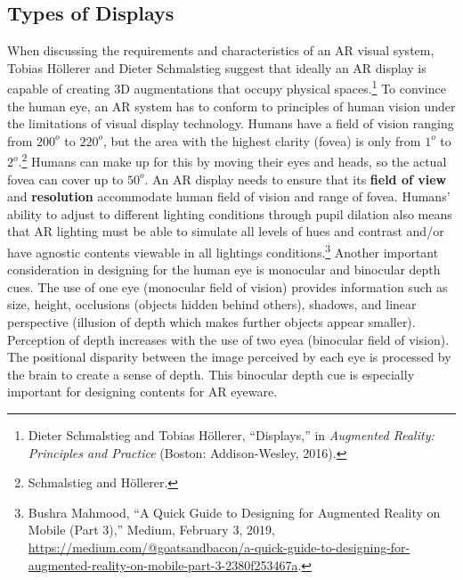 \subsection{Types of Displays}
When discussing the requirements and characteristics of an AR visual system, Tobias Höllerer and Dieter Schmalstieg suggest that ideally an AR display is capable of creating 3D augmentations that occupy physical spaces.\footnote{Dieter Schmalstieg and Tobias Höllerer, “Displays,” in \textit{Augmented Reality: Principles and Practice} (Boston: Addison-Wesley, 2016).} To convince the human eye, an AR system has to conform to principles of human vision under the limitations of visual display technology. Humans have a field of vision ranging from $200^o$ to $220^o$, but the area with the highest clarity (fovea) is only from $1^o$ to $2^o$.\footnote{Schmalstieg and Höllerer.} Humans can make up for this by moving their eyes and heads, so the actual fovea can cover up to $50^o$. An AR display needs to ensure that its \textbf{field of view} and \textbf{resolution} accommodate human field of vision and range of fovea. Humans' ability to adjust to different lighting conditions through pupil dilation also means that AR lighting must be able to simulate all levels of hues and contrast and/or have agnostic contents viewable in all lightings conditions.\footnote{Bushra Mahmood, “A Quick Guide to Designing for Augmented Reality on Mobile (Part 3),” Medium, February 3, 2019, \url{https://medium.com/@goatsandbacon/a-quick-guide-to-designing-for-augmented-reality-on-mobile-part-3-2380f253467a}.} Another important consideration in designing for the human eye is monocular and binocular depth cues. The use of one eye (monocular field of vision) provides information such as size, height, occlusions (objects hidden behind others), shadows, and linear perspective (illusion of depth which makes further objects appear smaller). Perception of depth increases with the use of two eyea (binocular field of vision). The positional disparity between the image perceived by each eye is processed by the brain to create a sense of depth. This binocular depth cue is especially important for designing contents for AR eyeware.

